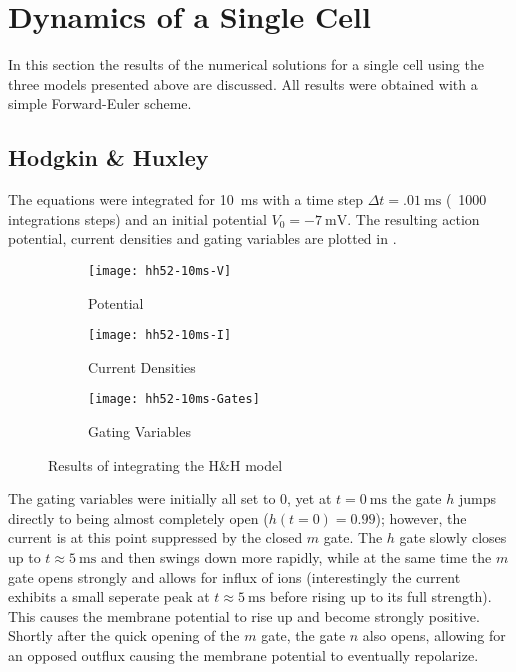 \section{Dynamics of a Single Cell}
In this section the results of the numerical solutions for a single cell
using the three models presented above are discussed. All results were
obtained with a simple Forward-Euler scheme.


\subsection{Hodgkin \& Huxley}
The equations were integrated for \SI{10}{\milli\second} with a time step
$\Delta{t}=\SI{.01}{\milli\second}$ (\ie~1000 integrations steps) and an
initial potential $V_0=\SI{-7}{\milli\volt}$. The resulting action potential,
current densities and gating variables are plotted in .

\begin{figure}[h]
    \centering
    \begin{subfigure}[h]{.3\textwidth}
        \texttt{[image: hh52-10ms-V]}
        \vspace{-\baselineskip}
        \caption{Potential}
        \label{fig:hh1V}
    \end{subfigure}
    \begin{subfigure}[h]{.3\textwidth}
        \texttt{[image: hh52-10ms-I]}
        \vspace{-\baselineskip}
        \caption{Current Densities}
        \label{fig:hh1I}
    \end{subfigure}
    \begin{subfigure}[h]{.3\textwidth}
        \texttt{[image: hh52-10ms-Gates]}
        \vspace{-\baselineskip}
        \caption{Gating Variables}
        \label{fig:hh1Gates}
    \end{subfigure}
    \caption{Results of integrating the H\&H model}
    \label{fig:hh1}
\end{figure}

The gating variables were initially all set to 0, yet at
$t=\SI{0}{\milli\second}$ the  gate $h$ jumps directly to being almost
completely open ($h(t=0)=0.99$); however, the  current is at this point
suppressed by the closed $m$ gate. The $h$ gate slowly closes up to
$t\approx\SI{5}{\milli\second}$ and then swings down more rapidly, while at the same
time the $m$ gate opens strongly and allows for influx of  ions
(interestingly the  current exhibits a small seperate peak at
$t\approx\SI{5}{\milli\second}$ before rising up to its full strength). This
causes the membrane potential to rise up and become strongly positive. Shortly
after the quick opening of the $m$ gate, the  gate $n$ also opens,
allowing for an opposed  outflux causing the membrane potential to
eventually repolarize.

